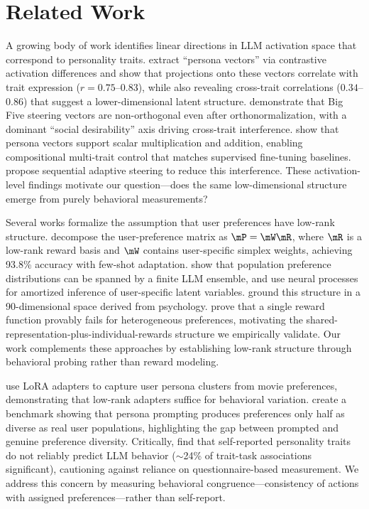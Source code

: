 \section{Related Work}
\label{sec:related}

A growing body of work identifies linear directions in LLM activation space that correspond to personality traits.
\citet{chen2025persona} extract ``persona vectors'' via contrastive activation differences and show that projections onto these vectors correlate with trait expression ($r = 0.75$--$0.83$), while also revealing cross-trait correlations ($0.34$--$0.86$) that suggest a lower-dimensional latent structure.
\citet{bhandari2026personality} demonstrate that Big Five steering vectors are non-orthogonal even after orthonormalization, with a dominant ``social desirability'' axis driving cross-trait interference.
\citet{feng2026persona} show that persona vectors support scalar multiplication and addition, enabling compositional multi-trait control that matches supervised fine-tuning baselines.
\citet{hoppe2026sliders} propose sequential adaptive steering to reduce this interference.
These activation-level findings motivate our question---does the same low-dimensional structure emerge from purely behavioral measurements?

Several works formalize the assumption that user preferences have low-rank structure.
\citet{bose2025lore} decompose the user-preference matrix as $\mP = \mW \mR$, where $\mR$ is a low-rank reward basis and $\mW$ contains user-specific simplex weights, achieving 93.8\% accuracy with few-shot adaptation.
\citet{wang2026proxies} show that population preference distributions can be spanned by a finite LLM ensemble, and \citet{kobalczyk2024fewshot} use neural processes for amortized inference of user-specific latent variables.
\citet{li2025alignx} ground this structure in a 90-dimensional space derived from psychology.
\citet{zhong2024multiparty} prove that a single reward function provably fails for heterogeneous preferences, motivating the shared-representation-plus-individual-rewards structure we empirically validate.
Our work complements these approaches by establishing low-rank structure through behavioral probing rather than reward modeling.

\citet{thakur2024personas} use LoRA adapters to capture user persona clusters from movie preferences, demonstrating that low-rank adapters suffice for behavioral variation.
\citet{zollo2024personalllm} create a benchmark showing that persona prompting produces preferences only half as diverse as real user populations, highlighting the gap between prompted and genuine preference diversity.
Critically, \citet{han2025illusion} find that self-reported personality traits do not reliably predict LLM behavior ($\sim$24\% of trait-task associations significant), cautioning against reliance on questionnaire-based measurement.
We address this concern by measuring behavioral congruence---consistency of actions with assigned preferences---rather than self-report.
